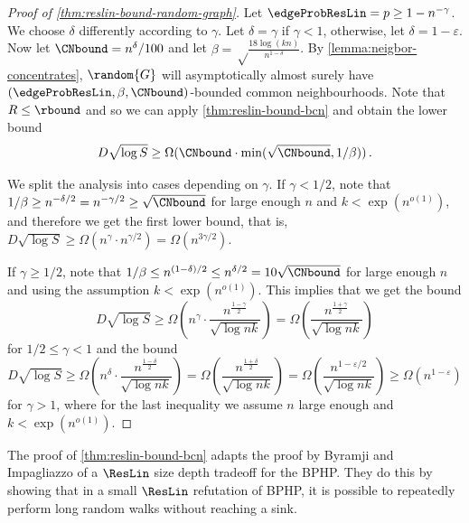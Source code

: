 \begin{proof}[Proof of \autoref{thm:reslin-bound-random-graph}]
    Let $\edgeProbResLin = p \geq 1-n^{-\gamma}$. We choose $\delta$ differently according to $\gamma$. Let $\delta = \gamma$ if $\gamma <1$, otherwise, let $\delta = 1 - \varepsilon$. Now let $\CNbound = n^\delta/100$ and let $\beta = \sqrt\frac{18\log(kn)}{n^{1-\delta}}$.
    By \autoref{lemma:neigbor-concentrates}, $\random{G}$ will asymptotically almost surely have $(\edgeProbResLin,\beta,\CNbound)$-bounded common neighbourhoods. Note that $R \leq \rbound $
    and so we can apply \autoref{thm:reslin-bound-bcn} and obtain the lower bound 
    \begin{equation*}
        D\sqrt{\log S}\geq\Omega(\CNbound\cdot\min(\sqrt{\CNbound},1/\beta))  \,.
    \end{equation*}
    
    We split the analysis into cases depending on $\gamma$. If $\gamma < 1/2$, 
    note that $1/\beta \geq n^{-\delta/2} = n^{-\gamma/2}  \geq \sqrt{\CNbound}$ for large enough $n$ and $k< \exp(n^{o(1)})$,
    and therefore we get the first lower bound, that is,
$ D\sqrt{\log S}\geq \Omega(n^\gamma\cdot n^{\gamma/2}) = \Omega( n^{3\gamma/2})$.


    

If $\gamma \geq 1/2$, note that 
$1/\beta \leq n^{(1-\delta)/2}\leq n^{\delta/2} = 10\sqrt{\CNbound}$ for large enough $n$ and using the assumption $k< \exp(n^{o(1)})$.
This implies that we get the bound
\begin{equation*}
        D\sqrt{\log S}\geq \Omega\left(n^\gamma\cdot \frac{n^{\frac{1-\gamma}{2}}}{\sqrt{\log nk}} \right) 
        = \Omega\left(\frac{n^{\frac{1+\gamma}{2}}}{\sqrt{\log nk}} \right)
    \end{equation*}
for $1/2\leq \gamma < 1$ and the bound
   \begin{equation*}
        D\sqrt{\log S}\geq\Omega\left(n^{\delta}\cdot \frac{n^{\frac{1-\delta}{2}}}{\sqrt{\log nk}} \right) 
        = \Omega\left(\frac{n^{\frac{1+\delta}{2}}}{\sqrt{\log nk}} \right)
        = \Omega\left(\frac{n^{1 - \varepsilon/2}}{\sqrt{\log nk}} \right)
        \geq \Omega\left(n^{1 - \varepsilon}\right)
    \end{equation*}
for $\gamma > 1$, where for the last inequality we assume $n$ large enough and $k< \exp(n^{o(1)})$.

\end{proof}

The proof of \autoref{thm:reslin-bound-bcn} adapts the proof by Byramji and Impagliazzo \cite{BI25bphp} of a $\ResLin$ size depth tradeoff for the BPHP. They do this by showing that in a small $\ResLin$ refutation of BPHP, it is possible to repeatedly perform long random walks without reaching a sink. 


